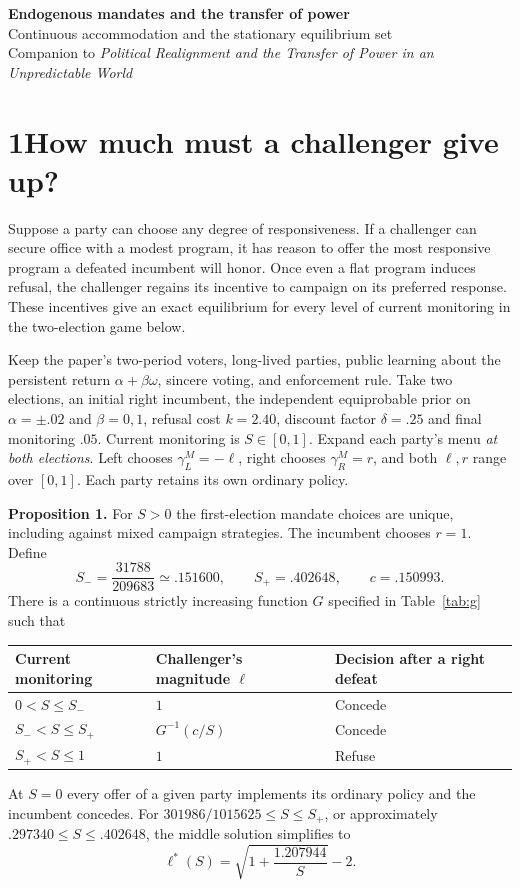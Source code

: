 \documentclass[11pt,letterpaper]{article}
\begin{document}
\thispagestyle{plain}
\begin{center}
{\LARGE\bfseries Endogenous mandates and the transfer of power}\\[5pt]
{\large Continuous accommodation and the stationary equilibrium set}\\[4pt]
{\small Companion to \emph{Political Realignment and the Transfer of Power in an Unpredictable World}}
\end{center}

\section*{1\quad How much must a challenger give up?}
Suppose a party can choose any degree of responsiveness. If a challenger can secure office with a modest program, it has reason to offer the most responsive program a defeated incumbent will honor. Once even a flat program induces refusal, the challenger regains its incentive to campaign on its preferred response. These incentives give an exact equilibrium for every level of current monitoring in the two-election game below.

Keep the paper's two-period voters, long-lived parties, public learning about the persistent return $\alpha+\beta\omega$, sincere voting, and enforcement rule. Take two elections, an initial right incumbent, the independent equiprobable prior on $\alpha=\pm.02$ and $\beta=0,1$, refusal cost $k=2.40$, discount factor $\delta=.25$ and final monitoring $.05$. Current monitoring is $S\in[0,1]$. Expand each party's menu \emph{at both elections}. Left chooses $\gamma_L^M=-\ell$, right chooses $\gamma_R^M=r$, and both $\ell,r$ range over $[0,1]$. Each party retains its own ordinary policy.

\textbf{Proposition 1.} For $S>0$ the first-election mandate choices are unique, including against mixed campaign strategies. The incumbent chooses $r=1$. Define
\[
 S_-=\frac{31788}{209683}\simeq .151600,\qquad S_+=.402648,\qquad c=.150993 .
\]
There is a continuous strictly increasing function $G$ specified in Table~\ref{tab:g} such that
\begin{center}
\begin{tabular}{@{}lll@{}}
\toprule
Current monitoring & Challenger's magnitude $\ell$ & Decision after a right defeat\\
\midrule
$0<S\le S_-$       & $1$ & Concede\\
$S_-<S\le S_+$     & $G^{-1}(c/S)$ & Concede\\
$S_+<S\le 1$       & $1$ & Refuse\\
\bottomrule
\end{tabular}
\end{center}
At $S=0$ every offer of a given party implements its ordinary policy and the incumbent concedes. For $301986/1015625\le S\le S_+$, or approximately $.297340\le S\le .402648$, the middle solution simplifies to
\[
                     \ell^*(S)=\sqrt{1+\frac{1.207944}{S}}-2 .
\]
\end{document}
